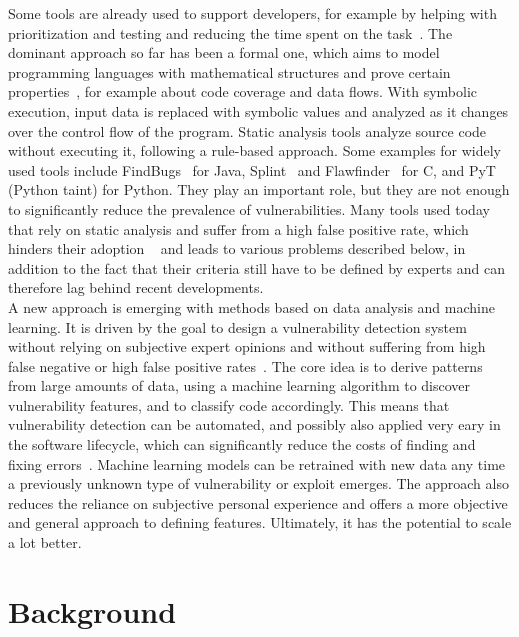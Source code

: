 \documentclass[
a4paper,
pagesize,
pdftex,
12pt,
twoside, %
BCOR=5mm, %
ngerman,
fleqn,
final,
]{scrartcl}
\begin{document}
	Some tools are already used to support developers, for example by helping with prioritization and testing and reducing the time spent on the task~\cite{Dam.2017}. The dominant approach so far has been a formal one, which aims to model programming languages with mathematical structures and prove certain properties~\cite{Allamanis.2018}, for example about code coverage and data flows. With symbolic execution, input data is replaced with symbolic values and analyzed as it changes over the control flow of the program. Static analysis tools analyze source code without executing it, following a rule-based approach. Some examples for widely used tools include FindBugs~\cite{Hovemeyer.2004,Hovemeyer.2005} for Java, Splint~\cite{Evans.2002} and Flawfinder~\cite{Wheeler.2006} for C, and PyT~\cite{Micheelsen.2016} (Python taint) for Python. They play an important role, but they are not enough to significantly reduce the prevalence of vulnerabilities. Many tools used today that rely on static analysis and suffer from a high false positive rate, which hinders their adoption ~\cite{Liu.2018} and leads to various problems described below, in addition to the fact that their criteria still have to be defined by experts and can therefore lag behind recent developments.\\
	A new approach is emerging with methods based on data analysis and machine learning. It is driven by the goal to design a vulnerability detection system without relying on subjective expert opinions and without suffering from high false negative or high false positive rates~\cite{Li.2018}. The core idea is to derive patterns from large amounts of data, using a machine learning algorithm to discover vulnerability features, and to classify code accordingly. This means that vulnerability detection can be automated, and possibly also applied very eary in the software lifecycle, which can significantly reduce the costs of finding and fixing errors~\cite{Dam.2017}. Machine learning models can be retrained with new data any time a previously unknown type of vulnerability or exploit emerges. The approach also reduces the reliance on subjective personal experience and offers a more objective and general approach to defining features. Ultimately, it has the potential to scale a lot better.
	
	
	\newpage
	\section{Background}
	
\end{document}
